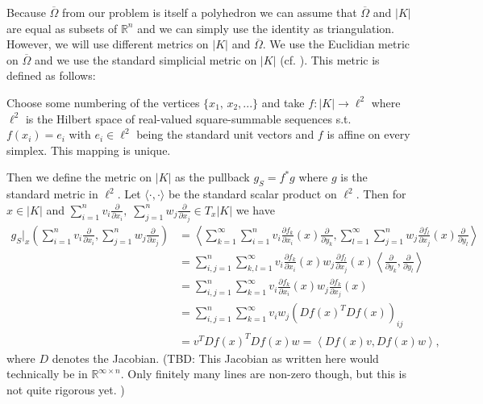 \documentclass[12pt,a4paper]{article}
\theoremstyle{definition}
\newcommand{\omegabar}{\overline{\Omega}}
\newcommand{\real}{\mathbb{R}}
\begin{document}
Because $\omegabar$ from our problem is itself a polyhedron we can
assume that $\omegabar$ and $|K|$ are equal as subsets of $\real^n$ and we can
simply use the identity as triangulation.
However, we will use different metrics on $|K|$ and $\omegabar$. 
We use the Euclidian metric on 
$\omegabar$ and we use the standard simplicial metric on $|K|$ (cf. 
\cite[p.191]{goldshtein}). This metric is defined as follows:

Choose some numbering of the vertices $\{ x_1,\, x_2, ... \}$ and
take $f: |K| \rightarrow \ell^2$ where $\ell^2$ is the 
Hilbert space of real-valued square-summable sequences s.t. $f(x_i) = e_i$ 
with $e_i \in \ell^2$ being the standard unit vectors and $f$ is affine on 
every simplex. This mapping is unique.%

Then we define the metric on $|K|$ as the pullback $g_S = f^*g$ 
where $g$ is the standard metric in $\ell^2$. Let $\langle \cdot , 
\cdot \rangle$ be the standard scalar product on $\ell^2$. Then for $x \in |K|$ 
and $\sum_{i=1}^n v_i \frac{\partial}{\partial x_i}, \; 
\sum_{j=1}^n w_j \frac{\partial}{\partial x_j} \in T_x |K|$ we have 
\begin{align*}
g_S|_x\left(\sum_{i=1}^n v_i \frac{\partial}{\partial x_i}, 
\sum_{j=1}^n w_j \frac{\partial}{\partial x_j}\right) &= 
\left\langle \sum_{k=1}^\infty \sum_{i=1}^n v_i 
\frac{\partial f_k}{\partial x_i} (x)
\frac{\partial }{\partial y_k}, 
\sum_{l=1}^\infty \sum_{j=1}^n w_j \frac{\partial f_l}{\partial x_j} (x)
\frac{\partial }{\partial y_l} \right\rangle \\   
&= \sum_{i,j=1}^n \sum_{k,l=1}^\infty v_i \frac{\partial f_k}{\partial x_i} (x)
w_j \frac{\partial f_l}{\partial x_j} (x) 
\left\langle \frac{\partial }{\partial y_k}, \frac{\partial }{\partial y_l} 
\right\rangle\\
&= \sum_{i,j=1}^n \sum_{k=1}^\infty v_i \frac{\partial f_k}{\partial x_i} (x)
w_j \frac{\partial f_k}{\partial x_j} (x)\\
&= \sum_{i,j=1}^n \sum_{k=1}^\infty v_i w_j \left( Df(x)^T Df(x) \right)_{ij} \\
&= v^T Df(x)^T Df(x) w = \left\langle Df(x) v, Df(x) w \right\rangle,
\end{align*}
where $D$ denotes the Jacobian. 
{\color{red} (TBD: This Jacobian as written here would technically be in 
$\real^{\infty \times n}$. Only finitely many lines are non-zero though, 
but this is not quite rigorous yet. )}
\end{document}
